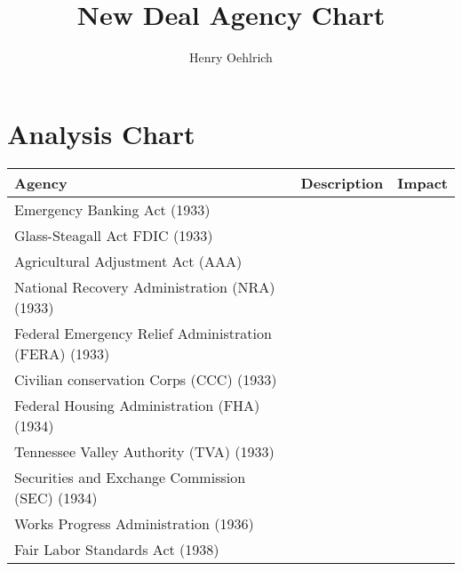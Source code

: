 \documentclass{article}
\title{New Deal Agency Chart}
\author{Henry Oehlrich}
\begin{document}
\maketitle

\section{Analysis Chart}
\begin{tabular}{p{3cm} p{6cm} p{5cm}}
    Agency & Description & Impact \\
    \hline

    Emergency Banking Act (1933)
    &
    &
    \\
    \hline

    Glass-Steagall Act FDIC (1933)
    &
    &
    \\
    \hline

    Agricultural Adjustment Act (AAA)
    &
    &
    \\
    \hline

    National Recovery Administration (NRA) (1933)
    &
    &
    \\
    \hline

    Federal Emergency Relief Administration (FERA) (1933)
    &
    &
    \\
    \hline

    Civilian conservation Corps (CCC) (1933)
    &
    &
    \\
    \hline

    Federal Housing Administration (FHA) (1934)
    &
    &
    \\
    \hline

    Tennessee Valley Authority (TVA) (1933)
    &
    &
    \\
    \hline

    Securities and Exchange Commission (SEC) (1934)
    &
    &
    \\
    \hline

    Works Progress Administration (1936)
    &
    &
    \\
    \hline

    Fair Labor Standards Act (1938)
    &
    &
    \\
\end{tabular}
\end{document}
